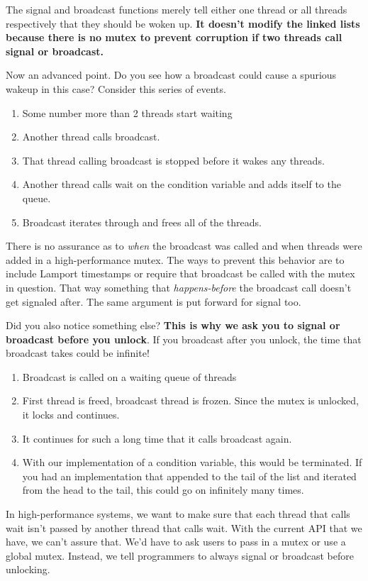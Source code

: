 The signal and broadcast functions merely tell either one thread or all threads respectively that they should be woken up.
\textbf{It doesn't modify the linked lists because there is no mutex to prevent corruption if two threads call signal or broadcast.}

Now an advanced point.
Do you see how a broadcast could cause a spurious wakeup in this case? Consider this series of events.

\begin{enumerate}
\item Some number more than 2 threads start waiting
\item Another thread calls broadcast.
\item That thread calling broadcast is stopped before it wakes any threads.
\item Another thread calls wait on the condition variable and adds itself to the queue.
\item Broadcast iterates through and frees all of the threads.
\end{enumerate}

There is no assurance as to \textit{when} the broadcast was called and when threads were added in a high-performance mutex.
The ways to prevent this behavior are to include Lamport timestamps or require that broadcast be called with the mutex in question.
That way something that \textit{happens-before} the broadcast call doesn't get signaled after.
The same argument is put forward for signal too.

Did you also notice something else?
\textbf{This is why we ask you to signal or broadcast before you unlock}.
If you broadcast after you unlock, the time that broadcast takes could be infinite!
\begin{enumerate}
\item Broadcast is called on a waiting queue of threads
\item First thread is freed, broadcast thread is frozen. Since the mutex is unlocked, it locks and continues.
\item It continues for such a long time that it calls broadcast again.
\item With our implementation of a condition variable, this would be terminated.
  If you had an implementation that appended to the tail of the list and iterated from the head to the tail, this could go on infinitely many times.
\end{enumerate}

In high-performance systems, we want to make sure that each thread that calls wait isn't passed by another thread that calls wait.
With the current API that we have, we can't assure that.
We'd have to ask users to pass in a mutex or use a global mutex.
Instead, we tell programmers to always signal or broadcast before unlocking.



